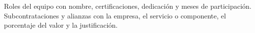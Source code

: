%
%

  {Roles del equipo con nombre, certificaciones, dedicación y meses de
   participación. Subcontrataciones y alianzas con la empresa, el servicio o
   componente, el porcentaje del valor y la justificación.}

\newcommand\rolTOcho[1]{\RegistroNuevo{t8}{#1}}
\newcommand\subcontratoTOcho[1]{\RegistroNuevo{t8s}{#1}}


